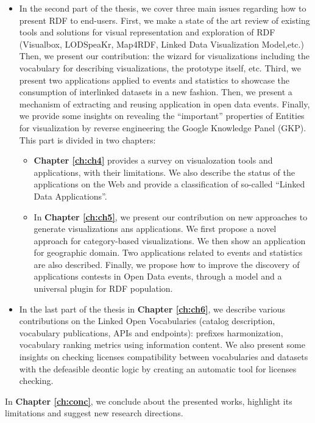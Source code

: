 \begin{itemize}
 \item In the second part of the thesis, we cover three main issues regarding how to present RDF to end-users. First, we make a state of the art review of existing tools and solutions for visual representation and exploration of RDF (Visualbox, LODSpeaKr, Map4RDF, Linked Data Visualization Model,etc.) Then, we present our contribution: the wizard for visualizations including the vocabulary for describing visualizations, the prototype itself, etc. Third, we present two applications applied to events and statistics to showcase the consumption of interlinked datasets in a new fashion. Then, we present a mechanism of extracting and reusing application in open data events. Finally, we provide some insights on revealing the ``important'' properties of Entities for visualization by reverse engineering the Google Knowledge Panel (GKP). This part is divided in two chapters:
 \begin{itemize}
 \item \textbf{Chapter \ref{ch:ch4}} provides a survey on visualozation tools and applications, with their limitations. We also describe the status of the applications on the Web and provide a classification of so-called ``Linked Data Applications''.
 \item  In \textbf{Chapter \ref{ch:ch5}}, we present our contribution on new approaches to generate visualizations ans applications. We first propose a novel approach for category-based visualizations. We then show an application for geographic domain. Two applications related to events and statistics are also described. Finally, we propose how to improve the discovery of applications contests in Open Data events, through a model and a universal plugin for RDF population. 
 \end{itemize}
 \item In the last part of the thesis in \textbf{Chapter \ref{ch:ch6}}, we describe various contributions on the Linked Open Vocabularies (catalog description, vocabulary publications, APIs and endpoints): prefixes harmonization, vocabulary ranking metrics using information content. We also present some insights on checking licenses compatibility between vocabularies and datasets with the defeasible deontic logic by creating an automatic tool for licenses checking. 
\end{itemize}

 In \textbf{Chapter \ref{ch:conc}}, we conclude about the presented works, highlight its limitations and suggest new research directions.